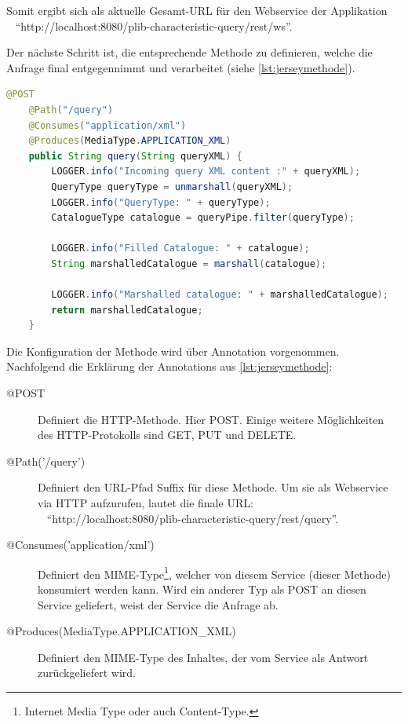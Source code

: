 Somit ergibt sich als aktuelle Gesamt-\gls{URL} für den \gls{Webservice} der Applikation \\~
 \enquote{http://localhost:8080/plib-characteristic-query/rest/ws}.
 
Der nächste Schritt ist, die entsprechende Methode zu definieren, welche die Anfrage final entgegennimmt und verarbeitet (siehe \autoref{lst:jerseymethode}). 
 
  \begin{lstlisting}[caption=Jersey Methode, language=Java, label=lst:jerseymethode]
    @POST
    @Path("/query")
    @Consumes("application/xml")
    @Produces(MediaType.APPLICATION_XML)
    public String query(String queryXML) {
        LOGGER.info("Incoming query XML content :" + queryXML);
        QueryType queryType = unmarshall(queryXML);
        LOGGER.info("QueryType: " + queryType);
        CatalogueType catalogue = queryPipe.filter(queryType);

        LOGGER.info("Filled Catalogue: " + catalogue);
        String marshalledCatalogue = marshall(catalogue);

        LOGGER.info("Marshalled catalogue: " + marshalledCatalogue);
        return marshalledCatalogue;
    }
 \end{lstlisting}  

Die Konfiguration der Methode wird über \Gls{Annotation} vorgenommen. Nachfolgend die Erklärung der \Glspl{Annotation} aus \autoref{lst:jerseymethode}:

\begin{description}
\item[@POST] Definiert die \gls{HTTP-Methode}. Hier \gls{POST}. Einige weitere Möglichkeiten des \gls{HTTP}-Protokolls sind GET, PUT und DELETE.
\item[@Path('/query')] Definiert den URL-Pfad Suffix für diese Methode. Um sie als \gls{Webservice} via \gls{HTTP} aufzurufen, lautet die finale URL: \\~
\enquote{http://localhost:8080/plib-characteristic-query/rest/query}. 
\item[@Consumes('application/xml')] Definiert den \gls{MIME-Type}\footnote{Internet Media Type oder auch Content-Type.}, welcher von diesem Service (dieser Methode) konsumiert werden kann. Wird ein anderer Typ als POST an diesen Service geliefert, weist der Service die Anfrage ab. 
\item[@Produces(MediaType.APPLICATION\_XML)] Definiert den \gls{MIME-Type} des Inhaltes, der vom Service als Antwort zurückgeliefert wird.  
\end{description}

